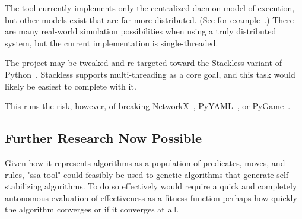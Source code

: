 \begin{task}
  \label{task:stackless}
  The tool currently implements only the centralized daemon model of execution,
    but other models exist that are far more distributed.
  (See for example~\autocite{ssa:dist}.)
  There are many real-world simulation possibilities when using a truly distributed system,
    but the current implementation is single-threaded.

  The project may be tweaked and re-targeted toward the Stackless variant of Python~\autocite{stackless}.
  Stackless supports multi-threading as a core goal, and this task would likely be easiest to complete with it.

  This runs the risk, however, of breaking NetworkX~\autocite{hagberg:networkx}, PyYAML~\autocite{pyyaml}, or PyGame~\autocite{pygame}.
\end{task}

\subsection{Further Research Now Possible}

\begin{task}
  \label{task:genetic}
  Given how it represents algorithms as a population of predicates, moves, and rules,
    "ssa-tool" could feasibly be used to genetic algorithms that generate
    self-stabilizing algorithms.
  To do so effectively would require a quick and completely autonomous
    evaluation of effectiveness as a fitness function \Dash
    perhaps how quickly the algorithm converges or if it converges at all.
\end{task}

